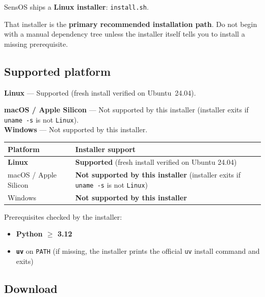 \documentclass[11pt,a4paper,oneside]{article}
\newcommand{\pathcode}[1]{\texttt{#1}}
\begin{document}
SensOS ships a \textbf{Linux installer}: \pathcode{install.sh}.

That installer is the \textbf{primary recommended installation path}. Do not begin with a manual dependency tree unless the installer itself tells you to install a missing prerequisite.

\subsection{Supported platform}

\begin{supportedbox}
\textbf{Linux} — Supported (fresh install verified on Ubuntu~24.04).
\end{supportedbox}

\begin{warningbox}
\textbf{macOS / Apple Silicon} — Not supported by this installer (installer exits if \texttt{uname -s} is not \texttt{Linux}).\\[0.4em]
\textbf{Windows} — Not supported by this installer.
\end{warningbox}

\begin{center}
\begin{tabularx}{\textwidth}{@{}Y L@{}}
\toprule
\textbf{Platform} & \textbf{Installer support} \\
\midrule
\textbf{Linux} & \textbf{Supported} (fresh install verified on Ubuntu 24.04) \\
macOS / Apple Silicon & \textbf{Not supported by this installer} (installer exits if \texttt{uname -s} is not \texttt{Linux}) \\
Windows & \textbf{Not supported by this installer} \\
\bottomrule
\end{tabularx}
\end{center}

Prerequisites checked by the installer:

\begin{itemize}
  \item \textbf{Python $\geq$ 3.12}
  \item \textbf{\texttt{uv}} on \texttt{PATH} (if missing, the installer prints the official \texttt{uv} install command and exits)
\end{itemize}

\subsection{Download}
\end{document}
